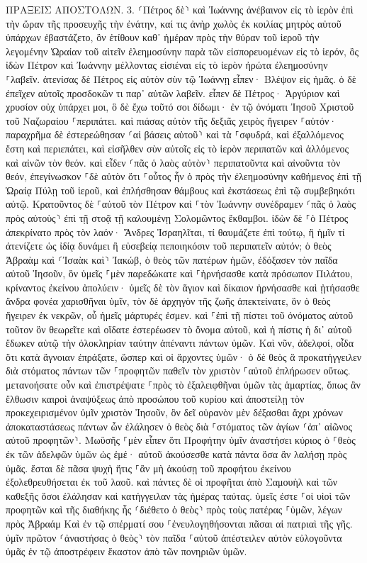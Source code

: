 \documentclass[twoside, 9pt]{extreport}
\begin{document}
ΠΡΑΞΕΙΣ ΑΠΟΣΤΟΛΩΝ.
3.
⸂Πέτρος δὲ⸃ καὶ Ἰωάννης ἀνέβαινον εἰς τὸ ἱερὸν ἐπὶ τὴν ὥραν τῆς προσευχῆς τὴν ἐνάτην, 
καί τις ἀνὴρ χωλὸς ἐκ κοιλίας μητρὸς αὐτοῦ ὑπάρχων ἐβαστάζετο, ὃν ἐτίθουν καθ᾽ ἡμέραν πρὸς τὴν θύραν τοῦ ἱεροῦ τὴν λεγομένην Ὡραίαν τοῦ αἰτεῖν ἐλεημοσύνην παρὰ τῶν εἰσπορευομένων εἰς τὸ ἱερόν, 
ὃς ἰδὼν Πέτρον καὶ Ἰωάννην μέλλοντας εἰσιέναι εἰς τὸ ἱερὸν ἠρώτα ἐλεημοσύνην ⸀λαβεῖν. 
ἀτενίσας δὲ Πέτρος εἰς αὐτὸν σὺν τῷ Ἰωάννῃ εἶπεν· Βλέψον εἰς ἡμᾶς. 
ὁ δὲ ἐπεῖχεν αὐτοῖς προσδοκῶν τι παρ᾽ αὐτῶν λαβεῖν. 
εἶπεν δὲ Πέτρος· Ἀργύριον καὶ χρυσίον οὐχ ὑπάρχει μοι, ὃ δὲ ἔχω τοῦτό σοι δίδωμι· ἐν τῷ ὀνόματι Ἰησοῦ Χριστοῦ τοῦ Ναζωραίου ⸀περιπάτει. 
καὶ πιάσας αὐτὸν τῆς δεξιᾶς χειρὸς ἤγειρεν ⸀αὐτόν· παραχρῆμα δὲ ἐστερεώθησαν ⸂αἱ βάσεις αὐτοῦ⸃ καὶ τὰ ⸀σφυδρά, 
καὶ ἐξαλλόμενος ἔστη καὶ περιεπάτει, καὶ εἰσῆλθεν σὺν αὐτοῖς εἰς τὸ ἱερὸν περιπατῶν καὶ ἁλλόμενος καὶ αἰνῶν τὸν θεόν. 
καὶ εἶδεν ⸂πᾶς ὁ λαὸς αὐτὸν⸃ περιπατοῦντα καὶ αἰνοῦντα τὸν θεόν, 
ἐπεγίνωσκον ⸀δὲ αὐτὸν ὅτι ⸀οὗτος ἦν ὁ πρὸς τὴν ἐλεημοσύνην καθήμενος ἐπὶ τῇ Ὡραίᾳ Πύλῃ τοῦ ἱεροῦ, καὶ ἐπλήσθησαν θάμβους καὶ ἐκστάσεως ἐπὶ τῷ συμβεβηκότι αὐτῷ. 
Κρατοῦντος δὲ ⸀αὐτοῦ τὸν Πέτρον καὶ ⸀τὸν Ἰωάννην συνέδραμεν ⸂πᾶς ὁ λαὸς πρὸς αὐτοὺς⸃ ἐπὶ τῇ στοᾷ τῇ καλουμένῃ Σολομῶντος ἔκθαμβοι. 
ἰδὼν δὲ ⸀ὁ Πέτρος ἀπεκρίνατο πρὸς τὸν λαόν· Ἄνδρες Ἰσραηλῖται, τί θαυμάζετε ἐπὶ τούτῳ, ἢ ἡμῖν τί ἀτενίζετε ὡς ἰδίᾳ δυνάμει ἢ εὐσεβείᾳ πεποιηκόσιν τοῦ περιπατεῖν αὐτόν; 
ὁ θεὸς Ἀβραὰμ καὶ ⸂Ἰσαὰκ καὶ⸃ Ἰακώβ, ὁ θεὸς τῶν πατέρων ἡμῶν, ἐδόξασεν τὸν παῖδα αὐτοῦ Ἰησοῦν, ὃν ὑμεῖς ⸀μὲν παρεδώκατε καὶ ⸀ἠρνήσασθε κατὰ πρόσωπον Πιλάτου, κρίναντος ἐκείνου ἀπολύειν· 
ὑμεῖς δὲ τὸν ἅγιον καὶ δίκαιον ἠρνήσασθε καὶ ᾐτήσασθε ἄνδρα φονέα χαρισθῆναι ὑμῖν, 
τὸν δὲ ἀρχηγὸν τῆς ζωῆς ἀπεκτείνατε, ὃν ὁ θεὸς ἤγειρεν ἐκ νεκρῶν, οὗ ἡμεῖς μάρτυρές ἐσμεν. 
καὶ ⸀ἐπὶ τῇ πίστει τοῦ ὀνόματος αὐτοῦ τοῦτον ὃν θεωρεῖτε καὶ οἴδατε ἐστερέωσεν τὸ ὄνομα αὐτοῦ, καὶ ἡ πίστις ἡ δι᾽ αὐτοῦ ἔδωκεν αὐτῷ τὴν ὁλοκληρίαν ταύτην ἀπέναντι πάντων ὑμῶν. 
Καὶ νῦν, ἀδελφοί, οἶδα ὅτι κατὰ ἄγνοιαν ἐπράξατε, ὥσπερ καὶ οἱ ἄρχοντες ὑμῶν· 
ὁ δὲ θεὸς ἃ προκατήγγειλεν διὰ στόματος πάντων τῶν ⸀προφητῶν παθεῖν τὸν χριστὸν ⸀αὐτοῦ ἐπλήρωσεν οὕτως. 
μετανοήσατε οὖν καὶ ἐπιστρέψατε ⸀πρὸς τὸ ἐξαλειφθῆναι ὑμῶν τὰς ἁμαρτίας, 
ὅπως ἂν ἔλθωσιν καιροὶ ἀναψύξεως ἀπὸ προσώπου τοῦ κυρίου καὶ ἀποστείλῃ τὸν προκεχειρισμένον ὑμῖν χριστὸν Ἰησοῦν, 
ὃν δεῖ οὐρανὸν μὲν δέξασθαι ἄχρι χρόνων ἀποκαταστάσεως πάντων ὧν ἐλάλησεν ὁ θεὸς διὰ ⸀στόματος τῶν ἁγίων ⸂ἀπ᾽ αἰῶνος αὐτοῦ προφητῶν⸃. 
Μωϋσῆς ⸀μὲν εἶπεν ὅτι Προφήτην ὑμῖν ἀναστήσει κύριος ὁ ⸀θεὸς ἐκ τῶν ἀδελφῶν ὑμῶν ὡς ἐμέ· αὐτοῦ ἀκούσεσθε κατὰ πάντα ὅσα ἂν λαλήσῃ πρὸς ὑμᾶς. 
ἔσται δὲ πᾶσα ψυχὴ ἥτις ⸀ἂν μὴ ἀκούσῃ τοῦ προφήτου ἐκείνου ἐξολεθρευθήσεται ἐκ τοῦ λαοῦ. 
καὶ πάντες δὲ οἱ προφῆται ἀπὸ Σαμουὴλ καὶ τῶν καθεξῆς ὅσοι ἐλάλησαν καὶ κατήγγειλαν τὰς ἡμέρας ταύτας. 
ὑμεῖς ἐστε ⸀οἱ υἱοὶ τῶν προφητῶν καὶ τῆς διαθήκης ἧς ⸂διέθετο ὁ θεὸς⸃ πρὸς τοὺς πατέρας ⸀ὑμῶν, λέγων πρὸς Ἀβραάμ Καὶ ἐν τῷ σπέρματί σου ⸀ἐνευλογηθήσονται πᾶσαι αἱ πατριαὶ τῆς γῆς. 
ὑμῖν πρῶτον ⸂ἀναστήσας ὁ θεὸς⸃ τὸν παῖδα ⸀αὐτοῦ ἀπέστειλεν αὐτὸν εὐλογοῦντα ὑμᾶς ἐν τῷ ἀποστρέφειν ἕκαστον ἀπὸ τῶν πονηριῶν ὑμῶν. 
\end{document}
